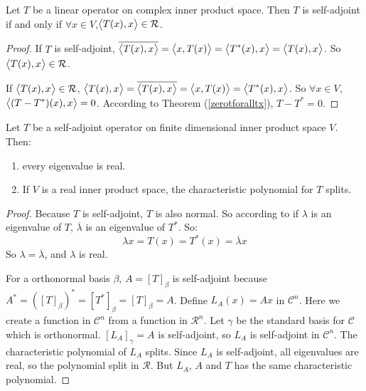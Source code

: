 \begin{theorem}
    Let $T$ be a linear operator on complex inner product space. Then $T$ is self-adjoint if and only if $\forall x \in V$,$\left\langle \displaystyle T(x), x \right\rangle \in \mathcal{R}$.
\end{theorem}
\begin{proof}
    If $T$ is self-adjoint, $\overline{\left\langle \displaystyle T(x), x \right\rangle} = \left\langle \displaystyle x, T(x) \right\rangle = \left\langle \displaystyle T^*(x), x \right\rangle = \left\langle \displaystyle T(x), x \right\rangle$. So $\left\langle \displaystyle T(x), x \right\rangle \in \mathcal{R}$.
    
    If $\left\langle \displaystyle T(x), x \right\rangle \in \mathcal{R}$, $\left\langle \displaystyle T(x), x \right\rangle = \overline{\left\langle \displaystyle T(x), x \right\rangle} = \left\langle \displaystyle x, T(x) \right\rangle = \left\langle \displaystyle T^*(x), x \right\rangle$. So $\forall x \in V$, $\left\langle \displaystyle (T - T^*)(x), x \right\rangle = 0$. According to Theorem (\ref{zerotforalltx}), $T - T^* = 0$.
\end{proof}


\begin{theorem}
    Let $T$ be a self-adjoint operator on finite dimensional inner product space $V$. Then:
    \begin{enumerate}
        \item every eigenvalue is real.
        \item If $V$ is a real inner product space, the characteristic polynomial for $T$ splits.
    \end{enumerate}
\end{theorem}
\begin{proof}
    Because $T$ is self-adjoint, $T$ is also normal. So according to  if $\lambda$ is an eigenvalue of $T$,  $\overline{\lambda}$ is an eigenvalue of $T^*$. So:
    \begin{equation*}
        \lambda x = T(x) = T^*(x) = \overline{\lambda} x
    \end{equation*}
    So $\lambda = \overline{\lambda}$, and $\lambda$ is real.
    
    For a orthonormal basis $\beta$, $A = [T]_\beta$ is self-adjoint because $A^* = ([T]_\beta)^* = [T^*]_\beta = [T]_\beta = A$. Define $L_A(x) = Ax$ in $\mathcal{C}^n$. Here we create a function in $\mathcal{C}^n$ from a function in $\mathcal{R}^n$. Let $\gamma$ be the standard basis for $\mathcal{C}$ which is orthonormal. $[L_A]_\gamma = A$ is self-adjoint, so $L_A$ is self-adjoint in $\mathcal{C}^n$. The characteristic polynomial of $L_A$ splits. Since $L_A$ is self-adjoint, all eigenvalues are real, so the polynomial split in $\mathcal{R}$. But $L_A$, $A$ and $T$ has the same characteristic polynomial.
\end{proof}

